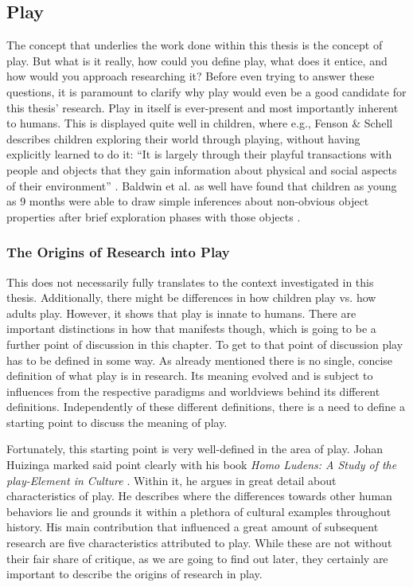 \subsection{Play}

The concept that underlies the work done within this thesis is the concept of play. But what is it really, how could you define play, what does it entice, and how would you approach researching it? Before even trying to answer these questions, it is paramount to clarify why play would even be a good candidate for this thesis' research. Play in itself is ever-present and most importantly inherent to humans. This is displayed quite well in children, where e.g., Fenson \& Schell describes children exploring their world through playing, without having explicitly learned to do it: \enquote{It is largely through their playful transactions with people and objects that they gain information about physical and social aspects of their environment} \cite{fenson1985origins}. Baldwin et al. as well have found that children as young as 9 months were able to draw simple inferences about non-obvious object properties after brief exploration phases with those objects \cite{baldwin1993infants}.

\subsubsection{The Origins of Research into Play}

This does not necessarily fully translates to the context investigated in this thesis. Additionally, there might be differences in how children play vs. how adults play. However, it shows that play is innate to humans. There are important distinctions in how that manifests though, which is going to be a further point of discussion in this chapter. To get to that point of discussion play has to be defined in some way. As already mentioned there is no single, concise definition of what play is in research. Its meaning evolved and is subject to influences from the respective paradigms and worldviews behind its different definitions. Independently of these different definitions, there is a need to define a starting point to discuss the meaning of play.

Fortunately, this starting point is very well-defined in the area of play. Johan Huizinga marked said point clearly with his book \textit{Homo Ludens: A Study of the play-Element in Culture} \cite{huizinga2020homo}. Within it, he argues in great detail about characteristics of play. He describes where the differences towards other human behaviors lie and grounds it within a plethora of cultural examples throughout history. His main contribution that influenced a great amount of subsequent research are five characteristics attributed to play. While these are not without their fair share of critique, as we are going to find out later, they certainly are important to describe the origins of research in play.

